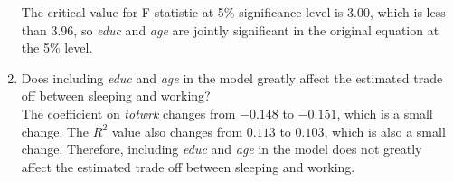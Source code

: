 \documentclass[12pt]{article}
\begin{document}
\begin{flushleft}
\begin{enumerate}
    The critical value for F-statistic at 5\% significance level is 3.00, which is less than 3.96, so \textit{educ} and \textit{age} are jointly significant in the original equation at the 5\% level.
    \item Does including \textit{educ} and \textit{age} in the model greatly affect the estimated trade off between sleeping and working?\\
    The coefficient on \textit{totwrk} changes from $-0.148$ to $-0.151$, which is a small change. The $R^2$ value also changes from $0.113$ to $0.103$, which is also a small change. Therefore, including \textit{educ} and \textit{age} in the model does not greatly affect the estimated trade off between sleeping and working.
\end{enumerate}
\end{flushleft}
\end{document}
